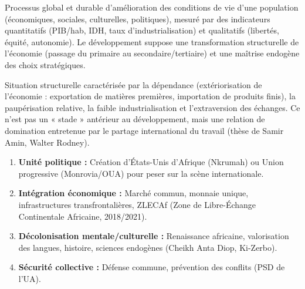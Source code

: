 \documentclass[11pt]{article}
\newcommand{\cle}[1]{{\popxbold\color{popdark}#1}}
\newcounter{popsec}
\newcounter{popsub}
\newcommand{\courssub}[1]{%
  \stepcounter{popsub}%
  \par\vspace{9pt}\noindent{\popxbold\fontsize{11.5}{13}\selectfont\color{popink}{\color{poporange}\thepopsec.\thepopsub}\hspace{6pt}#1}\par\nopagebreak\vspace{4pt}
}
\begin{document}
\courssub{Ressources à mobiliser}
\begin{definition}
Processus global et durable d'amélioration des conditions de vie d'une population (économiques, sociales, culturelles, politiques), mesuré par des indicateurs quantitatifs (PIB/hab, IDH, taux d'industrialisation) et qualitatifs (libertés, équité, autonomie). Le développement suppose une \cle{transformation structurelle} de l'économie (passage du primaire au secondaire/tertiaire) et une \cle{maîtrise endogène} des choix stratégiques.
\end{definition}

\begin{definition}
Situation structurelle caractérisée par la \cle{dépendance} (extériorisation de l'économie : exportation de matières premières, importation de produits finis), la \cle{paupérisation} relative, la \cle{faible industrialisation} et l'\cle{extraversion} des échanges. Ce n'est pas un « stade » antérieur au développement, mais une \cle{relation de domination} entretenue par le partage international du travail (thèse de Samir Amin, Walter Rodney).
\end{definition}

\begin{propriete}
\begin{enumerate}
    \item \textbf{Unité politique :} Création d'États-Unis d'Afrique (Nkrumah) ou Union progressive (Monrovia/OUA) pour peser sur la scène internationale.
    \item \textbf{Intégration économique :} Marché commun, monnaie unique, infrastructures transfrontalières, ZLECAf (Zone de Libre-Échange Continentale Africaine, 2018/2021).
    \item \textbf{Décolonisation mentale/culturelle :} Renaissance africaine, valorisation des langues, histoire, sciences endogènes (Cheikh Anta Diop, Ki-Zerbo).
    \item \textbf{Sécurité collective :} Défense commune, prévention des conflits (PSD de l'UA).
\end{enumerate}
\end{propriete}
\end{document}
